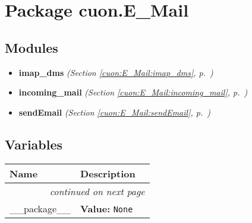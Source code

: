 %
%
%


\section{Package cuon.E\_Mail}

    \label{cuon:E_Mail}


\subsection{Modules}

\begin{itemize}
\setlength{\parskip}{0ex}
\item \textbf{imap\_dms}
  \textit{(Section \ref{cuon:E_Mail:imap_dms}, p.~\pageref{cuon:E_Mail:imap_dms})}

\item \textbf{incoming\_mail}
  \textit{(Section \ref{cuon:E_Mail:incoming_mail}, p.~\pageref{cuon:E_Mail:incoming_mail})}

\item \textbf{sendEmail}
  \textit{(Section \ref{cuon:E_Mail:sendEmail}, p.~\pageref{cuon:E_Mail:sendEmail})}

\end{itemize}



  \subsection{Variables}

    \vspace{-1cm}
\hspace{\varindent}\begin{longtable}{|p{\varnamewidth}|p{\vardescrwidth}|l}
\cline{1-2}
\cline{1-2} \centering \textbf{Name} & \centering \textbf{Description}& \\
\cline{1-2}
\endhead\cline{1-2}\multicolumn{3}{r}{\small\textit{continued on next page}}\\\endfoot\cline{1-2}
\endlastfoot\raggedright \_\-\_\-p\-a\-c\-k\-a\-g\-e\-\_\-\_\- & \raggedright \textbf{Value:} 
{\tt None}&\\
\cline{1-2}
\end{longtable}

